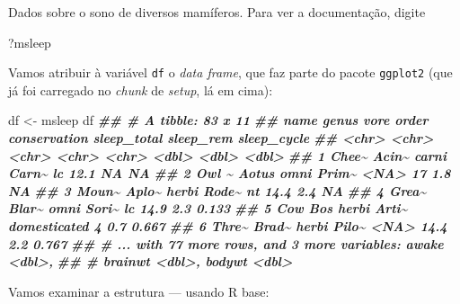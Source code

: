 \documentclass[
  12pt]{report}
\newenvironment{Shaded}{\begin{snugshade}}{\end{snugshade}}
\newcommand{\DocumentationTok}[1]{\textcolor[rgb]{0.56,0.35,0.01}{\textbf{\textit{#1}}}}
\newcommand{\NormalTok}[1]{#1}
\newcommand{\OtherTok}[1]{\textcolor[rgb]{0.56,0.35,0.01}{#1}}
\begin{document}
Dados sobre o sono de diversos mamíferos. Para ver a documentação, digite

\begin{Shaded}
\begin{Highlighting}[]
\NormalTok{?msleep}
\end{Highlighting}
\end{Shaded}

Vamos atribuir à variável \texttt{df} o \emph{data frame}, que faz parte do pacote \texttt{ggplot2} (que já foi carregado no \emph{chunk} de \emph{setup}, lá em cima):

\begin{Shaded}
\begin{Highlighting}[]
\NormalTok{df }\OtherTok{\textless{}{-}}\NormalTok{ msleep}
\NormalTok{df}
\DocumentationTok{\#\# \# A tibble: 83 x 11}
\DocumentationTok{\#\#   name  genus vore  order conservation sleep\_total sleep\_rem sleep\_cycle}
\DocumentationTok{\#\#   \textless{}chr\textgreater{} \textless{}chr\textgreater{} \textless{}chr\textgreater{} \textless{}chr\textgreater{} \textless{}chr\textgreater{}              \textless{}dbl\textgreater{}     \textless{}dbl\textgreater{}       \textless{}dbl\textgreater{}}
\DocumentationTok{\#\# 1 Chee\textasciitilde{} Acin\textasciitilde{} carni Carn\textasciitilde{} lc                  12.1      NA        NA    }
\DocumentationTok{\#\# 2 Owl \textasciitilde{} Aotus omni  Prim\textasciitilde{} \textless{}NA\textgreater{}                17         1.8      NA    }
\DocumentationTok{\#\# 3 Moun\textasciitilde{} Aplo\textasciitilde{} herbi Rode\textasciitilde{} nt                  14.4       2.4      NA    }
\DocumentationTok{\#\# 4 Grea\textasciitilde{} Blar\textasciitilde{} omni  Sori\textasciitilde{} lc                  14.9       2.3       0.133}
\DocumentationTok{\#\# 5 Cow   Bos   herbi Arti\textasciitilde{} domesticated         4         0.7       0.667}
\DocumentationTok{\#\# 6 Thre\textasciitilde{} Brad\textasciitilde{} herbi Pilo\textasciitilde{} \textless{}NA\textgreater{}                14.4       2.2       0.767}
\DocumentationTok{\#\# \# ... with 77 more rows, and 3 more variables: awake \textless{}dbl\textgreater{},}
\DocumentationTok{\#\# \#   brainwt \textless{}dbl\textgreater{}, bodywt \textless{}dbl\textgreater{}}
\end{Highlighting}
\end{Shaded}

Vamos examinar a estrutura --- usando R base:
\end{document}
